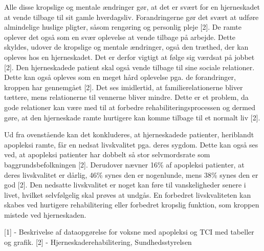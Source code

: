 Alle disse kropslige og mentale ændringer gør, at det er svært for en hjerneskadet at vende tilbage til sit gamle hverdagsliv. Forandringerne gør det svært at udføre almindelige huslige pligter, såsom rengøring og personlig pleje [2]. De ramte oplever det også som en svær oplevelse at vende tilbage på arbejde. Dette skyldes, udover de kropslige og mentale ændringer, også den træthed, der kan opleves hos en hjerneskadet. Det er derfor vigtigt at følge sig værdsat på jobbet [2]. Den hjerneskadede patient skal også vende tilbage til sine sociale relationer. Dette kan også opleves som en meget hård oplevelse pga. de forandringer, kroppen har gennemgået [2]. Det ses imidlertid, at familierelationerne bliver tættere, mens relationerne til vennerne bliver mindre. Dette er et problem, da gode relationer kan være med til at forbedre rehabiliteringsprocessen og dermed gøre, at den hjerneskade ramte hurtigere kan komme tilbage til et normalt liv [2].

Ud fra ovenstående kan det konkluderes, at hjerneskadede patienter, heriblandt apopleksi ramte, får en nedsat livskvalitet pga. deres sygdom. Dette kan også ses ved, at apopleksi patienter har dobbelt så stor selvmordsrate som baggrundsbefolkningen [2]. Derudover nævner 16\% af apopleksi patienter, at deres livskvalitet er dårlig, 46\% synes den er nogenlunde, mens 38\% synes den er god [2]. Den nedsatte livskvalitet er noget kan føre til vanskeligheder senere i livet, hvilket selvfølgelig skal prøves at undgås. En forbedret livskvaliteten kan skabes ved hurtigere rehabilitering eller forbedret kropslig funktion, som kroppen mistede ved hjerneskaden.  


[1] - Beskrivelse af dataopgørelse for voksne med apopleksi og TCI med tabeller og grafik. 
[2] - Hjerneskaderehabilitering, Sundhedsstyrelsen
